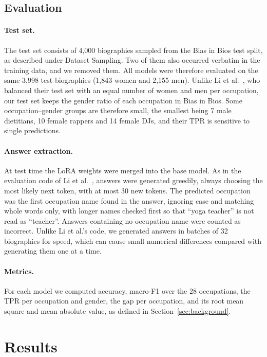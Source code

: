 \documentclass[sigconf]{acmart}
\begin{document}
\subsection{Evaluation}
\label{sec:evaluation}

\paragraph{Test set.}
The test set consists of 4,000 biographies sampled from the Bias in Bios test split, as described under Dataset Sampling. Two of them also occurred verbatim in the training data, and we removed them. All models were therefore evaluated on the same 3,998 test biographies (1,843 women and 2,155 men).
Unlike Li et al.~\cite{li2026inheritance}, who balanced their test set with an equal number of women and men per occupation, our test set keeps the gender ratio of each occupation in Bias in Bios. Some occupation--gender groups are therefore small, the smallest being 7 male dietitians, 10 female rappers and 14 female DJs, and their TPR is sensitive to single predictions.

\paragraph{Answer extraction.}
At test time the LoRA weights were merged into the base model.
As in the evaluation code of Li et al.~\cite{li2026inheritance}, answers were generated greedily, always choosing the most likely next token, with at most 30 new tokens. The predicted occupation was the first occupation name found in the answer, ignoring case and matching whole words only, with longer names checked first so that ``yoga teacher'' is not read as ``teacher''.
Answers containing no occupation name were counted as incorrect.
Unlike Li et al.'s code, we generated answers in batches of 32 biographies for speed, which can cause small numerical differences compared with generating them one at a time.

\paragraph{Metrics.}
For each model we computed accuracy, macro-F1 over the 28 occupations, the TPR per occupation and gender, the gap per occupation, and its root mean square and mean absolute value, as defined in Section~\ref{sec:background}.

\section{Results}
\end{document}
